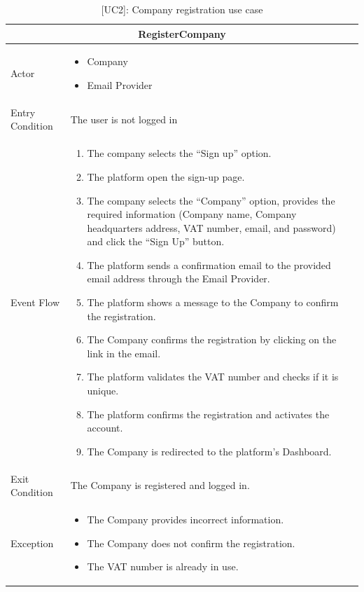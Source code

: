 \clearpage
\begin{table}[H]
    \centering
    \begin{tabular}{|p{3cm}|p{12cm}|}
    \hline
    \multicolumn{2}{|c|}{\textbf{RegisterCompany}} \\ \hline
    Actor & 
    \begin{itemize}
        \item Company
        \item Email Provider
    \end{itemize} \\ \hline
    Entry Condition & The user is not logged in \\ \hline
    Event Flow &
    \begin{enumerate}         
        \item The company selects the “Sign up” option.
        \item The platform open the sign-up page.
        \item The company selects the “Company” option, provides the required information (Company name, Company headquarters address, VAT number, email, and password) and click the “Sign Up” button.
        \item The platform sends a confirmation email to the provided email address through the Email Provider.
        \item The platform shows a message to the Company to confirm the registration.
        \item The Company confirms the registration by clicking on the link in the email.
        \item The platform validates the VAT number and checks if it is unique.
        \item The platform confirms the registration and activates the account.
        \item The Company is redirected to the platform's Dashboard.
    \end{enumerate} \\ \hline
    Exit Condition & The Company is registered and logged in. \\ \hline
    Exception & 
    \begin{itemize}
        \item The Company provides incorrect information.
        \item The Company does not confirm the registration.
        \item The VAT number is already in use.
    \end{itemize} \\ \hline
    \end{tabular}
    \caption{[UC2]: Company registration use case}
    \label{tab:UC2}
\end{table}

